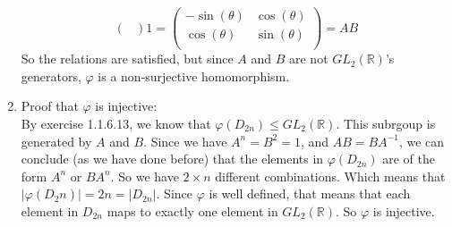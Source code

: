 \documentclass[12pt]{article}
\newcommand{\R}{\mathbb{R}}
\begin{document}
\begin{enumerate}[label=\textbf{\alph*.}]
\[{\begin{pmatrix}
            \end{pmatrix}}{1} 
            = \begin{pmatrix}
                -\sin(\theta) & \cos(\theta) \\
                \cos(\theta) & \sin(\theta) \\
            \end{pmatrix} = AB \]
            So the relations are satisfied,
            but since $A$ and $B$ are not $GL_2(\R)$'s generators,
            $\varphi$ is a non-surjective homomorphism.
        \item
            Proof that $\varphi$ is injective: \\
            By exercise 1.1.6.13,
            we know that $\varphi(D_{2n}) \leqslant GL_2(\R)$.
            This subrgoup is generated by $A$ and $B$.
            Since we have $A^n = B^2 = 1$,
            and $AB = BA^{-1}$,
            we can conclude (as we have done before)
            that the elements in $\varphi(D_{2n})$
            are of the form $A^n$ or $BA^n$.
            So we have $2 \times n$ different combinations.
            Which means that $|\varphi(D_2n)| = 2n = |D_{2n}|$.
            Since $\varphi$ is well defined,
            that means that each element in $D_{2n}$ maps to exactly
            one element in $GL_2(\R)$.
            So $\varphi$ is injective.
    \end{enumerate}

    
\end{document}
